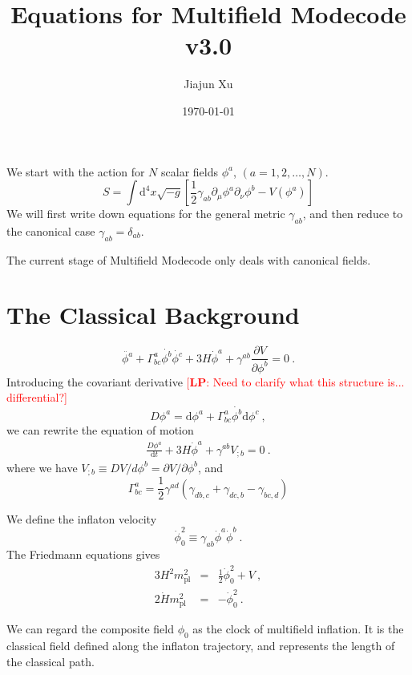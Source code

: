 \documentclass[11pt]{article}
\title{Equations for Multifield Modecode v3.0}
\author{Jiajun Xu}
\date{\today}
\newcommand{\mpl}{m_{\mathrm{pl}}}
\newcommand{\ud}{\mathrm{d}}
\newcommand{\pd}{\partial}
\def\f {{\phi}}
\newcommand{\lp}[1]{\textcolor{red}{[{\bf LP}: #1]}}
\begin{document}
\maketitle

We start with the action for $N$ scalar fields $\phi^a$, $(a=1,2, \dots, N)$. 
\begin{equation}
S = \int \ud^4 x \sqrt{-g} \left[ \frac{1}{2} \gamma_{ab} \pd_\mu \phi^a \pd_\nu \phi^b - V(\f^a) \right]
\end{equation}
We will first write down equations for the general metric $\gamma_{ab}$, and then reduce to the canonical case $\gamma_{ab} =\delta_{ab}$. 

The current stage of Multifield Modecode only deals with canonical fields. 

\section{The Classical Background}

\begin{equation}\label{bg_phi}
\ddot{\f^a} + \Gamma^a_{bc} \dot{\f^b} \dot{\f^c} + 3H \dot\f^a + \gamma^{ab} \frac{\pd V}{\pd \f^b} = 0  ~.
\end{equation}
Introducing the covariant derivative \lp{Need to clarify what this structure is... differential?}
\begin{equation}
D \f^a = \ud \f^a + \Gamma^a_{bc}\dot{\f^b}\ud\f^c ~,
\end{equation}
we can rewrite the equation of motion
\begin{eqnarray}
\frac{D\f^a}{\ud t} + 3H \dot\f^a + \gamma^{ab} V_{; b} = 0 ~. 
\end{eqnarray}
where we have $V_{;b} \equiv D V / d \f^b = \pd V/\pd \phi^b$, and
\[
\Gamma^a_{bc} = \frac{1}{2} \gamma^{ad}\left( \gamma_{db, c} + \gamma_{dc,b} - \gamma_{bc, d} \right)
\]

We define the inflaton velocity
\[
{\dot\f}_0^2 \equiv \gamma_{ab} {\dot\f}^a {\dot\f}^b ~. 
\]
The Friedmann equations gives
\begin{eqnarray}\label{fr_1}
3H^2\mpl^2 &=& \frac{1}{2} {\dot\f}_0^2 + V ~, \\ 
2\dot{H} \mpl^2 &=& - {\dot\f}_0^2 ~. \label{fr_2}
\end{eqnarray}

We can regard the composite field $\phi_0$ as the clock of multifield inflation. It is the classical field defined along the 
inflaton trajectory, and represents the length of the classical path. 
\end{document}
